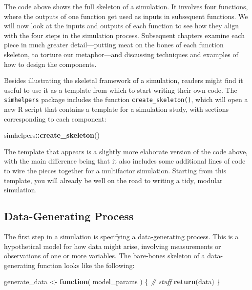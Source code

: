 \documentclass[
]{book}
\newenvironment{Shaded}{\begin{snugshade}}{\end{snugshade}}
\newcommand{\CommentTok}[1]{\textcolor[rgb]{0.56,0.35,0.01}{\textit{#1}}}
\newcommand{\ControlFlowTok}[1]{\textcolor[rgb]{0.13,0.29,0.53}{\textbf{#1}}}
\newcommand{\FunctionTok}[1]{\textcolor[rgb]{0.13,0.29,0.53}{\textbf{#1}}}
\newcommand{\NormalTok}[1]{#1}
\newcommand{\OtherTok}[1]{\textcolor[rgb]{0.56,0.35,0.01}{#1}}
\newcommand{\SpecialCharTok}[1]{\textcolor[rgb]{0.81,0.36,0.00}{\textbf{#1}}}
\begin{document}
The code above shows the full skeleton of a simulation.
It involves four functions, where the outputs of one function get used as inputs in subsequent functions.
We will now look at the inputs and outputs of each function to see how they align with the four steps in the simulation process.
Subsequent chapters examine each piece in much greater detail---putting meat on the bones of each function skeleton, to torture our metaphor---and discussing techniques and examples of how to design the components.

Besides illustrating the skeletal framework of a simulation, readers might find it useful to use it as a template from which to start writing their own code.
The \texttt{simhelpers} package includes the function \texttt{create\_skeleton()}, which will open a new R script that contains a template for a simulation study, with sections corresponding to each component:

\begin{Shaded}
\begin{Highlighting}[]
\NormalTok{simhelpers}\SpecialCharTok{::}\FunctionTok{create\_skeleton}\NormalTok{()}
\end{Highlighting}
\end{Shaded}

The template that appears is a slightly more elaborate version of the code above, with the main difference being that it also includes some additional lines of code to wire the pieces together for a multifactor simulation.
Starting from this template, you will already be well on the road to writing a tidy, modular simulation.

\subsection{Data-Generating Process}\label{data-generating-process}

The first step in a simulation is specifying a data-generating process. This is a hypothetical model for how data might arise, involving measurements or observations of one or more variables. The bare-bones skeleton of a data-generating function looks like the following:

\begin{Shaded}
\begin{Highlighting}[]
\NormalTok{generate\_data }\OtherTok{\textless{}{-}} \ControlFlowTok{function}\NormalTok{( model\_params ) \{}
  \CommentTok{\# stuff}
  \FunctionTok{return}\NormalTok{(data)}
\NormalTok{\}}
\end{Highlighting}
\end{Shaded}
\end{document}
